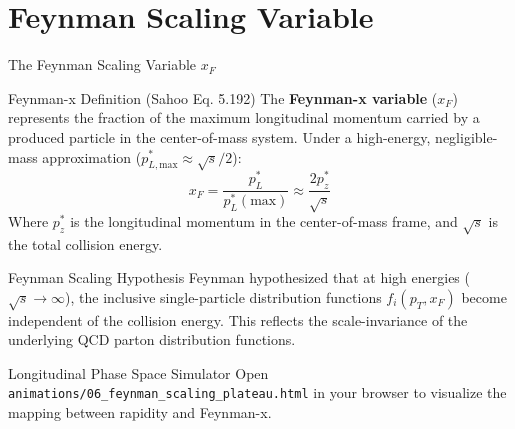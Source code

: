 \documentclass[aspectratio=169]{beamer}
\begin{document}
\section{Feynman Scaling Variable}

\begin{frame}{The Feynman Scaling Variable $x_F$}
    \begin{block}{Feynman-x Definition (Sahoo Eq. 5.192)}
        \small
        The \textbf{Feynman-x variable} ($x_F$) represents the fraction of the maximum longitudinal momentum carried by a produced particle in the center-of-mass system. Under a high-energy, negligible-mass approximation ($p_{L,\mathrm{max}}^* \approx \sqrt{s}/2$):
        \[ x_F = \frac{p_L^*}{p_L^*(\mathrm{max})} \approx \frac{2p_z^*}{\sqrt{s}} \]
        Where $p_z^*$ is the longitudinal momentum in the center-of-mass frame, and $\sqrt{s}$ is the total collision energy.
    \end{block}
    \begin{block}{Feynman Scaling Hypothesis}
        Feynman hypothesized that at high energies ($\sqrt{s} \to \infty$), the inclusive single-particle distribution functions $f_i(p_T, x_F)$ become independent of the collision energy. This reflects the scale-invariance of the underlying QCD parton distribution functions.
    \end{block}
    \begin{alertblock}{Longitudinal Phase Space Simulator}
        Open \texttt{animations/06\_feynman\_scaling\_plateau.html} in your browser to visualize the mapping between rapidity and Feynman-x.
    \end{alertblock}
\end{frame}
\end{document}
